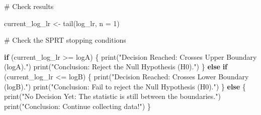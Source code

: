 \documentclass[
  letterpaper,
  DIV=11,
  numbers=noendperiod]{scrartcl}
\newenvironment{Shaded}{\begin{snugshade}}{\end{snugshade}}
\newcommand{\AttributeTok}[1]{\textcolor[rgb]{0.40,0.45,0.13}{#1}}
\newcommand{\CommentTok}[1]{\textcolor[rgb]{0.37,0.37,0.37}{#1}}
\newcommand{\ControlFlowTok}[1]{\textcolor[rgb]{0.00,0.23,0.31}{\textbf{#1}}}
\newcommand{\DecValTok}[1]{\textcolor[rgb]{0.68,0.00,0.00}{#1}}
\newcommand{\FunctionTok}[1]{\textcolor[rgb]{0.28,0.35,0.67}{#1}}
\newcommand{\NormalTok}[1]{\textcolor[rgb]{0.00,0.23,0.31}{#1}}
\newcommand{\OtherTok}[1]{\textcolor[rgb]{0.00,0.23,0.31}{#1}}
\newcommand{\SpecialCharTok}[1]{\textcolor[rgb]{0.37,0.37,0.37}{#1}}
\newcommand{\StringTok}[1]{\textcolor[rgb]{0.13,0.47,0.30}{#1}}
\begin{document}
\begin{Shaded}
\begin{Highlighting}[]
\CommentTok{\# Check results}

\NormalTok{current\_log\_lr }\OtherTok{\textless{}{-}} \FunctionTok{tail}\NormalTok{(log\_lr, }\AttributeTok{n =} \DecValTok{1}\NormalTok{)}

\CommentTok{\# Check the SPRT stopping conditions}

\ControlFlowTok{if}\NormalTok{ (current\_log\_lr }\SpecialCharTok{\textgreater{}=}\NormalTok{ logA) \{}
  \FunctionTok{print}\NormalTok{(}\StringTok{"Decision Reached: Crosses Upper Boundary (logA)."}\NormalTok{)}
  \FunctionTok{print}\NormalTok{(}\StringTok{"Conclusion: Reject the Null Hypothesis (H0)."}\NormalTok{)}
\NormalTok{\} }\ControlFlowTok{else} \ControlFlowTok{if}\NormalTok{ (current\_log\_lr }\SpecialCharTok{\textless{}=}\NormalTok{ logB) \{}
  \FunctionTok{print}\NormalTok{(}\StringTok{"Decision Reached: Crosses Lower Boundary (logB)."}\NormalTok{)}
  \FunctionTok{print}\NormalTok{(}\StringTok{"Conclusion: Fail to reject the Null Hypothesis (H0)."}\NormalTok{)}
\NormalTok{\} }\ControlFlowTok{else}\NormalTok{ \{}
  \FunctionTok{print}\NormalTok{(}\StringTok{"No Decision Yet: The statistic is still between the boundaries."}\NormalTok{)}
  \FunctionTok{print}\NormalTok{(}\StringTok{"Conclusion: Continue collecting data!"}\NormalTok{)}
\NormalTok{\}}
\end{Highlighting}
\end{Shaded}
\end{document}
